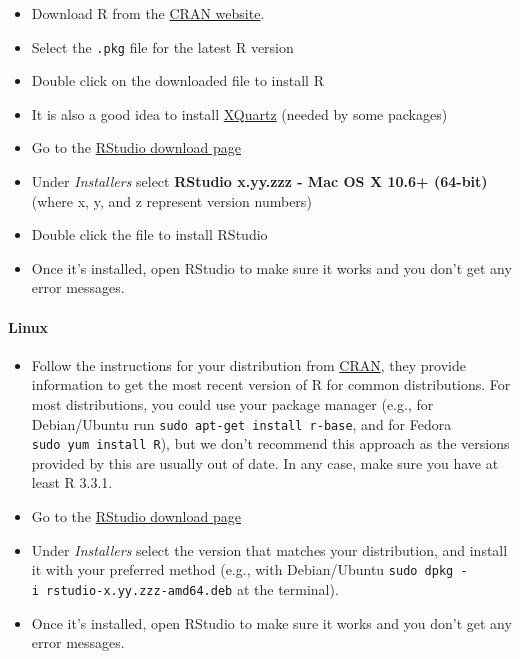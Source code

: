 \documentclass[12pt, krantz2,]{krantz}
\providecommand{\tightlist}{%
  \setlength{\itemsep}{0pt}\setlength{\parskip}{0pt}}
\let\oldparagraph\paragraph
\renewcommand{\paragraph}[1]{\oldparagraph{#1}\mbox{}}
\theoremstyle{definition}
\theoremstyle{definition}
\theoremstyle{definition}
\newcommand{\1}{\mathbbm{1}}
\begin{document}
\begin{itemize}
\tightlist
\item
  Download R from
  the \href{http://cran.r-project.org/bin/macosx}{CRAN website}.
\item
  Select the \texttt{.pkg} file for the latest R version
\item
  Double click on the downloaded file to install R
\item
  It is also a good idea to install \href{https://www.xquartz.org/}{XQuartz} (needed
  by some packages)
\item
  Go to the \href{https://www.rstudio.com/products/rstudio/download/\#download}{RStudio download
  page}
\item
  Under \emph{Installers} select \textbf{RStudio x.yy.zzz - Mac OS X 10.6+ (64-bit)}
  (where x, y, and z represent version numbers)
\item
  Double click the file to install RStudio
\item
  Once it's installed, open RStudio to make sure it works and you don't get any
  error messages.
\end{itemize}

\hypertarget{linux}{%
\paragraph{Linux}\label{linux}}

\begin{itemize}
\tightlist
\item
  Follow the instructions for your distribution
  from \href{https://cloud.r-project.org/bin/linux}{CRAN}, they provide information
  to get the most recent version of R for common distributions. For most
  distributions, you could use your package manager (e.g., for Debian/Ubuntu run
  \texttt{sudo\ apt-get\ install\ r-base}, and for Fedora \texttt{sudo\ yum\ install\ R}), but we
  don't recommend this approach as the versions provided by this are
  usually out of date. In any case, make sure you have at least R 3.3.1.
\item
  Go to the \href{https://www.rstudio.com/products/rstudio/download/\#download}{RStudio download
  page}
\item
  Under \emph{Installers} select the version that matches your distribution, and
  install it with your preferred method (e.g., with Debian/Ubuntu \texttt{sudo\ dpkg\ -i\ rstudio-x.yy.zzz-amd64.deb} at the terminal).
\item
  Once it's installed, open RStudio to make sure it works and you don't get any
  error messages.
\end{itemize}
\end{document}
